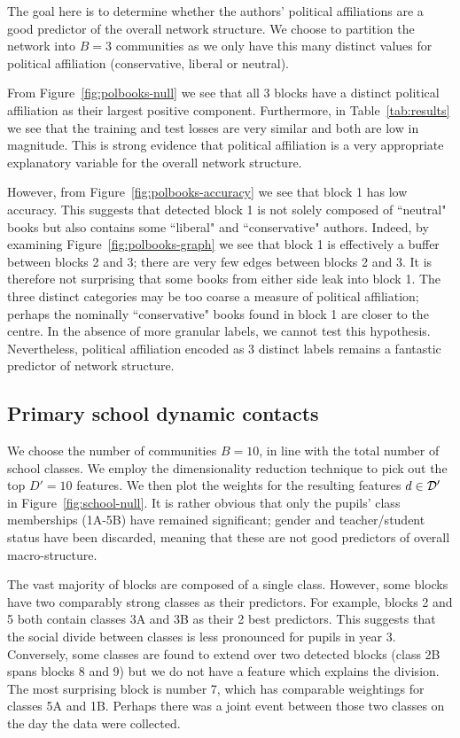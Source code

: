 The goal here is to 
determine whether the authors' political affiliations are a good predictor 
of the overall network structure. We choose to partition the network into $B=3$ communities as we only have this many distinct values for political affiliation (conservative, liberal or neutral).

From Figure~\ref{fig:polbooks-null} we see that all 3 blocks have a distinct political affiliation as their largest positive component.  
Furthermore, in Table~\ref{tab:results} we see that the training and test losses 
are very similar and both are low in magnitude. This is strong evidence 
that political affiliation is a very appropriate explanatory 
variable for the overall network structure.

However, from Figure~\ref{fig:polbooks-accuracy} we see that block 1 has low accuracy. 
This suggests that detected block 1 is not solely composed of ``neutral" books but also 
contains some ``liberal" and ``conservative" authors. Indeed, by examining 
Figure~\ref{fig:polbooks-graph} we see that block 1 is effectively a buffer between 
blocks 2 and 3; there are very few edges between blocks 2 and 3. It is therefore not 
surprising that some books from either side leak into block 1.
The three distinct categories may be 
too coarse a measure of political affiliation; perhaps the nominally 
``conservative" books found in block 1 are closer to the centre. 
In the absence of more granular labels, we cannot test this hypothesis. 
Nevertheless, political affiliation encoded as 3 distinct labels 
remains a fantastic predictor of network structure.

\subsection{Primary school dynamic contacts}

We choose the number of communities $B=10$, in line with the total number of 
school classes. We 
employ the dimensionality reduction technique to pick out the top $D'=10$ features. 
We then plot the weights for the resulting features $d \in \mathcal{D}'$ 
in Figure~\ref{fig:school-null}. It is rather obvious
that only the pupils' class memberships (1A-5B) have remained
significant;
gender and teacher/student status have been discarded,
meaning that these are not good predictors of overall macro-structure.

The vast majority of blocks are composed of a single class. 
However, some blocks have two comparably strong classes as their predictors. 
For example, blocks 2 and 5 both contain classes 3A and 3B as their 2 best predictors. 
This suggests that the social divide between classes is less pronounced 
for pupils in year 3. Conversely, some classes are found to extend over two 
detected blocks (class 2B spans blocks 8 and 9) but we do 
not have a feature which explains the division. The most surprising block 
is number 7, which has comparable weightings for classes 5A and 1B. 
Perhaps there was a joint event between those two classes on the day 
the data were collected.

